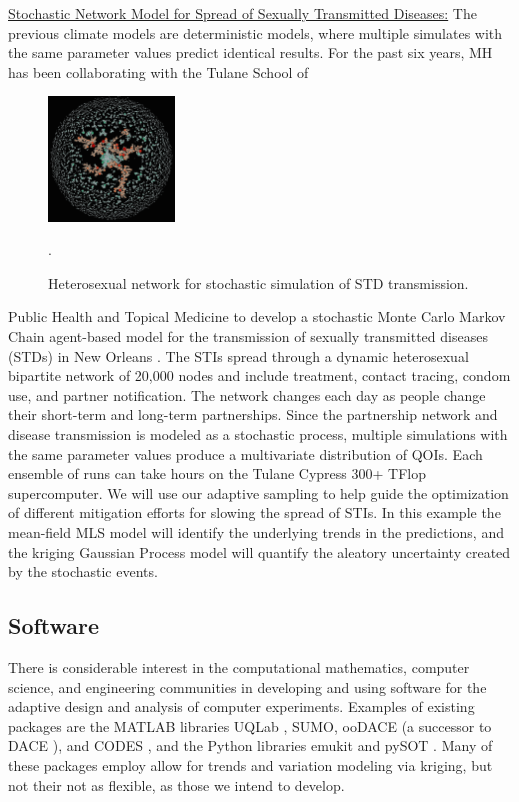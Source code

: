 \documentclass[11pt]{NSFamsart}
\begin{document}
\underline{Stochastic Network Model for Spread of Sexually Transmitted Diseases:}  The previous climate models are deterministic models, where multiple simulates with the same parameter values predict identical results. 
For the past six years, MH has been collaborating with the Tulane School of 
\begin{figure}
	  \begin{center}
	\includegraphics[width = 0.3\textwidth]{ProgramsImages/sexualNetworkNOLA}
	 \end{center}
	\caption{Heterosexual network for stochastic simulation of STD transmission.}.
	\label{netmodel}
\end{figure}
Public Health and Topical Medicine to develop a stochastic Monte Carlo Markov Chain agent-based model for the transmission of sexually transmitted diseases (STDs) in New Orleans \cite{azizi2018using}.  
The STIs spread through a dynamic heterosexual bipartite network of 20,000 nodes and include treatment, contact tracing, condom use, and partner notification. The network changes each day as people change their short-term and long-term partnerships.  
Since the partnership network and disease transmission is modeled as a stochastic process, multiple simulations with the same parameter values produce a multivariate  distribution of QOIs.  Each ensemble of runs can take hours on the Tulane Cypress 300+ TFlop supercomputer. 
We will use our adaptive sampling to help guide the optimization of different mitigation efforts for slowing the spread of STIs.  
In this example the mean-field MLS model will identify the underlying trends in the predictions, and the kriging Gaussian Process model will quantify the aleatory uncertainty created by the stochastic events.


\subsection{Software}
There is considerable interest in the computational mathematics, computer science, and engineering communities in developing and using software for the adaptive design and analysis of computer experiments.  Examples of existing packages are the MATLAB libraries UQLab \cite{UQLab2014}, SUMO\cite{SUMO2010}, ooDACE \cite{ooDACE2014} (a successor to DACE \cite{dace2002}), and CODES \cite{CODES2015}, and the Python libraries emukit \cite{emukit2019} and pySOT \cite{pySOT2015}.  Many of these packages employ allow for trends and variation modeling via kriging, but not their not as flexible, as those we intend to develop.
\end{document}
